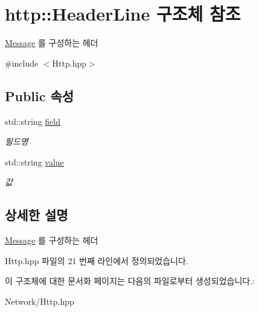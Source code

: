 \hypertarget{structhttp_1_1_header_line}{}\section{http\+:\+:Header\+Line 구조체 참조}
\label{structhttp_1_1_header_line}


\hyperlink{classhttp_1_1_message}{Message} 를 구성하는 헤더  




{\ttfamily \#include $<$Http.\+hpp$>$}

\subsection*{Public 속성}
\begin{DoxyCompactItemize}
\item 
\mbox{\label{structhttp_1_1_header_line_aab3fde3ed409272848cac9eb5b210f67}} 
std\+::string \hyperlink{structhttp_1_1_header_line_aab3fde3ed409272848cac9eb5b210f67}{field}
\begin{DoxyCompactList}\small\item\em 필드명 \end{DoxyCompactList}\item 
\mbox{\label{structhttp_1_1_header_line_a507bcfbe25b42ba790797d63ae45bc38}} 
std\+::string \hyperlink{structhttp_1_1_header_line_a507bcfbe25b42ba790797d63ae45bc38}{value}
\begin{DoxyCompactList}\small\item\em 값 \end{DoxyCompactList}\end{DoxyCompactItemize}


\subsection{상세한 설명}
\hyperlink{classhttp_1_1_message}{Message} 를 구성하는 헤더 

Http.\+hpp 파일의 21 번째 라인에서 정의되었습니다.



이 구조체에 대한 문서화 페이지는 다음의 파일로부터 생성되었습니다.\+:\begin{DoxyCompactItemize}
\item 
Network/Http.\+hpp\end{DoxyCompactItemize}
